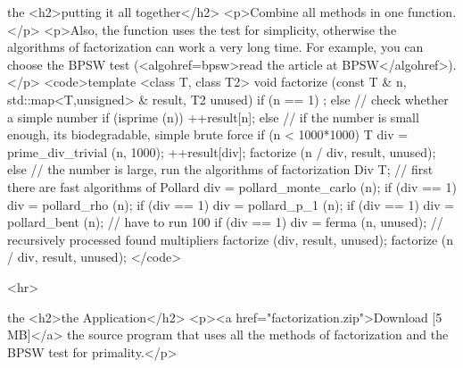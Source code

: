the <h2>putting it all together</h2>
<p>Combine all methods in one function.</p>
<p>Also, the function uses the test for simplicity, otherwise the algorithms of factorization can work a very long time. For example, you can choose the BPSW test (<algohref=bpsw>read the article at BPSW</algohref>).</p>
<code>template <class T, class T2>
void factorize (const T & n, std::map<T,unsigned> & result, T2 unused)
{
if (n == 1)
;
else
// check whether a simple number
if (isprime (n))
++result[n];
else
// if the number is small enough, its biodegradable, simple brute force
if (n < 1000*1000)
{
T div = prime_div_trivial (n, 1000);
++result[div];
factorize (n / div, result, unused);
}
else
{
// the number is large, run the algorithms of factorization
Div T;
// first there are fast algorithms of Pollard
div = pollard_monte_carlo (n);
if (div == 1)
div = pollard_rho (n);
if (div == 1)
div = pollard_p_1 (n);
if (div == 1)
div = pollard_bent (n);
// have to run 100%
if (div == 1)
div = ferma (n, unused);
// recursively processed found multipliers
factorize (div, result, unused);
factorize (n / div, result, unused);
}
}</code>

<hr>

the <h2>the Application</h2>
<p><a href="factorization.zip">Download [5 MB]</a> the source program that uses all the methods of factorization and the BPSW test for primality.</p>